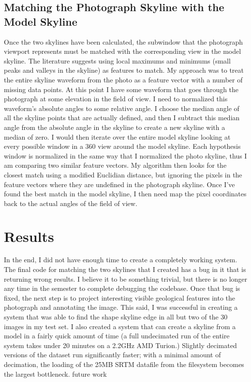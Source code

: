 \documentclass{acm_proc_article-sp}
\begin{document}
\subsection{Matching the Photograph Skyline with the Model Skyline}
    Once the two skylines have been calculated, the subwindow that the photograph viewport represents must be matched with the corresponding view in the model skyline.  The literature suggests using local maximums and minimums (small peaks and valleys in the skyline) as features to match. My approach was to treat the entire skyline  waveform from the photo as a feature vector with a number of missing data points. At this point I have some waveform that goes through the photograph at some elevation in the field of view.  I need to normalized this waveform’s absolute angles to some relative angle.  I choose the median angle of all the skyline points that are actually defined, and then I subtract this median angle from the absolute angle in the skyline to create a new skyline with a median of zero.  I would then iterate over the entire model skyline looking at every possible window in a 360 view around the model skyline.  Each hypothesis window is normalized in the same way that I normalized the photo skyline, thus I am comparing two similar feature vectors.  My algorithm then looks for the closest match using a modified Euclidian distance, but ignoring the pixels in the feature vectors where they are undefined in the photograph skyline.  Once I’ve found the best match in the model skyline, I then need map the pixel coordinates back to the actual angles of the field of view.

\section{Results}
    In the end, I did not have enough time to create a completely working system.  The final code for matching the two skylines that I created has a bug in it that is returning wrong results.  I believe it to be something trivial, but there is no longer any time in the semester to complete debugging the codebase.  Once that bug is fixed, the next step is to project interesting visible geological features into the photograph and annotating the image.
    This said, I was successful in creating a system that was able to find the shape skyline edge in all but two of the 30 images in my test set.  I also created a system that can create a skyline from a model in a fairly quick amount of time (a full undecimated run of the entire system takes under 20 minutes on a 2.2GHz AMD Turion.)  Slightly decimated versions of the dataset run significantly faster; with a minimal amount of decimation, the loading of the 25MB SRTM datafile from the filesystem becomes the largest bottleneck.  
future work
\end{document}
